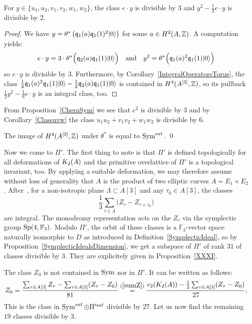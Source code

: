 \begin{proposition}\label{classedivisibleSym}
For $y\in\{u_1,u_2,v_1,v_2,w_1,w_2\}$, the class
$
e \cdot y
$
is divisible by $3$ and 
$
 y^2 - \frac{1}{3} e\cdot y
$
is divisible by $2$.
\end{proposition}
\begin{proof}
We have $y= \theta^*\left(\mathfrak{q}_1(a)\mathfrak{q}_1(1)^2|0\rangle\right)$ for some $a\in H^2(A,\mathbb{Z})$. A computation yields:
$$
e\cdot y = 3\cdot \theta^*\Big( \mathfrak{q}_2(a)\mathfrak{q}_1(1)|0\rangle \Big)
\quad \text{and}\quad
y^2 = \theta^*\Big(\mathfrak{q}_1(a)^2\mathfrak{q}_1(1)|0\rangle\Big)
$$
so $e\cdot y$ is divisible by $3$. Furthermore, by Corollary~\ref{IntegralOperatorsTorus}, the class 
$
\frac{1}{2} \mathfrak{q}_1(a)^2\mathfrak{q}_1(1)|0\rangle - \frac{1}{2} \mathfrak{q}_2(a)\mathfrak{q}_1(1)|0\rangle 
$
is contained in $H^4(A^{[3]},\mathbb{Z})$, so its pullback
$
 \frac{1}{2}y^2 - \frac{1}{6} e\cdot y
$
is an integral class, too.
\end{proof}
From Proposition~\ref{ChernSym} we see that
$e^2$ is divisible by $3$ and by Corollary~\ref{Classuvw}
the class $u_1u_2 + v_1v_2+w_1w_2$ is divisible by 6.
\begin{corollary}\label{SymSatImage}
The image of $H^4(A^{[3]},\mathbb{Z})$ under $\theta^*$ is equal to $\operatorname{Sym}^{sat}$. \qed
\end{corollary}
Now we come to $\Pi'$. 
The first thing to note is that $\Pi'$ is defined topologically for all deformations of $K_{ 2 }( A )$ and the primitive overlattice of $\Pi'$ is a topological invariant, too.  
By applying a suitable deformation, we may therefore assume without loss of generality that $A$ is the product of two elliptic curves $A=E_1\times E_2$. After~\cite[Eq.~(12)]{Hassett}, for a non-isotropic plane $\Lambda \subset A[3]$ and any $\tau_0\in A[3]$, the classes 
\begin{equation}
 \frac{1}{3}\sum_{\tau\in\Lambda} \Big(Z_{\tau} - Z_{\tau+\tau_0}\Big)
\end{equation}
are integral. The monodromy representation acts on the $Z_\tau$ via the symplectic group $\operatorname{Sp}(4,\mathbb F_3)$. Modulo $\Pi'$, the orbit of these classes is a $\mathbb F_3$-vector space naturally isomorphic to $D$ as introduced in Definition~\ref{SymplecticIdeal}, so by Proposition~\ref{SymplecticIdealsDimension}, we get a subspace of $\Pi'$ of rank $31$ of classes divisible by $3$. They are explicitely given in Proposition~\ref{XXXI}.

The class $Z_0$ is not contained in $\operatorname{Sym}$ nor in $\Pi'$.
It can be written as follows:
$$
Z_0=\frac{\sum_{\tau\in A[3]}Z_\tau-\sum_{\tau\in A[3]}(Z_\tau-Z_0)}{81}
\stackrel{(\ref{sumZ})}{=} \frac{c_2(K_2(A))-\frac{1}{3}\sum_{\tau\in A[3]}(Z_\tau-Z_0)}{27},
$$
This is the class in $\operatorname{Sym}^{sat}\oplus \Pi'^{sat}$ divisible by $27$. Let us now find the remaining $19$ classes divisible by $3$.


